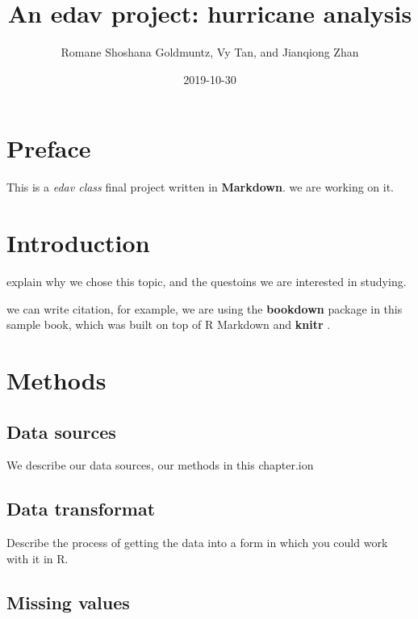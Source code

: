 \documentclass[]{book}
\title{An edav project: hurricane analysis}
\author{Romane Shoshana Goldmuntz, Vy Tan, and Jianqiong Zhan}
\date{2019-10-30}
\begin{document}
\maketitle

{
\setcounter{tocdepth}{1}
\tableofcontents
}
\hypertarget{preface}{%
\chapter{Preface}\label{preface}}

This is a \emph{edav class} final project written in \textbf{Markdown}. we are working on it.

\hypertarget{intro}{%
\chapter{Introduction}\label{intro}}

explain why we chose this topic, and the questoins we are interested in studying.

we can write citation, for example, we are using the \textbf{bookdown} package \citep{R-bookdown} in this sample book, which was built on top of R Markdown and \textbf{knitr} \citep{xie2015}.

\hypertarget{methods}{%
\chapter{Methods}\label{methods}}

\hypertarget{data-sources}{%
\section{Data sources}\label{data-sources}}

We describe our data sources, our methods in this chapter.ion

\hypertarget{data-transformat}{%
\section{Data transformat}\label{data-transformat}}

Describe the process of getting the data into a form in which you could work with it in R.

\hypertarget{missing-values}{%
\section{Missing values}\label{missing-values}}
\end{document}
